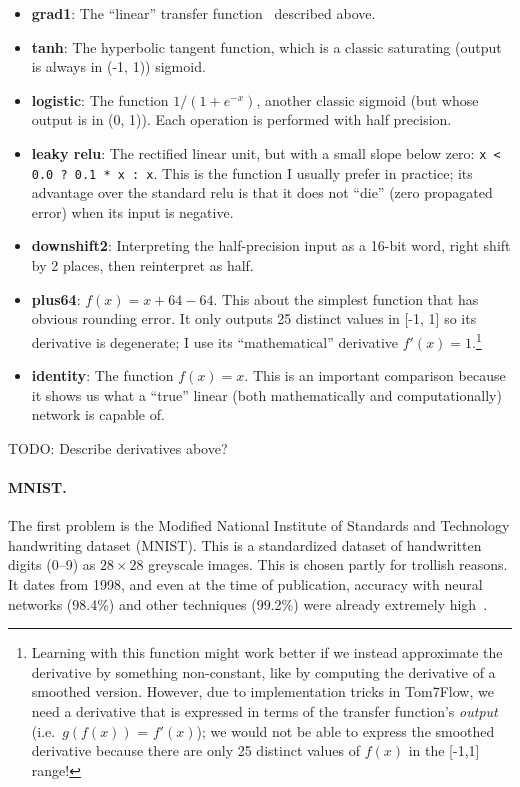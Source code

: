 \documentclass[twocolumn]{article}
\newcommand\xbyx[2]{\ensuremath{#1 {\times} #2}}
\begin{document}
\begin{itemize}
\item {\bf grad1}: The ``linear'' transfer function \gradone\ described above.
\item {\bf tanh}: The hyperbolic tangent function, which is a classic saturating (output is always in (-1, 1)) sigmoid.
\item {\bf logistic}: The function $1 / (1 + e^{-x})$, another classic sigmoid (but whose output is in (0, 1)). Each operation is performed with half precision.
\item {\bf leaky relu}: The rectified linear unit, but with a small slope below zero: \verb|x < 0.0 ? 0.1 * x : x|. This is the function I usually prefer in practice; its advantage over the standard relu is that it does not ``die'' (zero propagated error) when its input is negative.
\item {\bf downshift2}: Interpreting the half-precision input as a 16-bit word, right shift by 2 places, then reinterpret as half.
\item {\bf plus64}: $f(x) = x + 64 - 64$. This about the simplest function that has obvious rounding error. It only outputs 25 distinct values in [-1, 1] so its derivative is degenerate; I use its ``mathematical'' derivative $f'(x) = 1$.\footnote{Learning with this function might work better if we instead approximate the derivative by something non-constant, like by computing the derivative of a smoothed version. However, due to implementation tricks in Tom7Flow, we need a derivative that is expressed in terms of the transfer function's {\it output} (i.e.~$g(f(x))$ = $f'(x)$); we would not be able to express the smoothed derivative because there are only 25 distinct values of $f(x)$ in the [-1,1] range!}
\item {\bf identity}: The function $f(x) = x$. This is an important comparison because it shows us what a ``true'' linear (both mathematically and computationally) network is capable of.
\end{itemize}

TODO: Describe derivatives above?

\paragraph{MNIST.}
The first problem is the Modified National Institute of Standards and
Technology handwriting dataset (MNIST). This is a standardized dataset
of handwritten digits (0–9) as \xbyx{28}{28} greyscale images. This is chosen
partly for trollish reasons. It dates from 1998, and even at the time
of publication, accuracy with neural networks (98.4\%) and other
techniques (99.2\%) were already extremely high~\cite{lecun1998gradient}.
\end{document}
